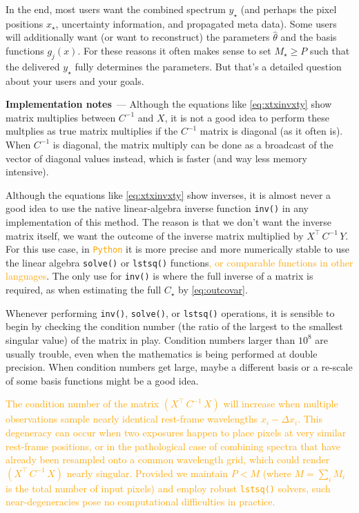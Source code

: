 \documentclass[modern, linenumbers]{aastex631}
\renewcommand{\paragraph}[1]{\medskip\par\noindent\textbf{#1}~---}
\newcommand{\modified}[1]{\textcolor{orange}{#1}}
\begin{document}
In the end, most users want the combined spectrum $y_\star$ (and perhaps the pixel positions $x_\star$, uncertainty information, and propagated meta data).
Some users will additionally want (or want to reconstruct) the parameters $\hat\theta$ and the basis functions $g_j(x)$.
For these reasons it often makes sense to set $M_\star\geq P$ such that the delivered $y_\star$ fully determines the parameters.
But that's a detailed question about your users and your goals.

\paragraph{Implementation notes}
Although the equations like \eqref{eq:xtxinvxty} show matrix multiplies between $C^{-1}$ and $X$, it is not a good idea to perform these multplies as true matrix multiplies if the $C^{-1}$ matrix is diagonal (as it often is).
When $C^{-1}$ is diagonal, the matrix multiply can be done as a broadcast of the vector of diagonal values instead, which is faster (and way less memory intensive).

Although the equations like \eqref{eq:xtxinvxty} show inverses, it is almost never a good idea to use the native linear-algebra inverse function \texttt{inv()} in any implementation of this method.
The reason is that we don't want the inverse matrix itself, we want the outcome of the inverse matrix multiplied by $X^\top\,C^{-1}\,Y$.
For this use case, in \modified{\texttt{Python}} it is more precise and more numerically stable to use the linear algebra \texttt{solve()} or \texttt{lstsq()} functions\modified{, or comparable functions in other languages}.
The only use for \texttt{inv()} is where the full inverse of a matrix is required, as when estimating the full $C_\star$ by \eqref{eq:outcovar}. %

Whenever performing \texttt{inv()}, \texttt{solve()}, or \texttt{lstsq()} operations, it is sensible to begin by checking the condition number (the ratio of the largest to the smallest singular value) of the matrix in play.
Condition numbers larger than $10^8$ are usually trouble, even when the mathematics is being performed at double precision.
When condition numbers get large, maybe a different basis or a re-scale of some basis functions might be a good idea.

\modified{The condition number of the matrix $(X^\top\,C^{-1}\,X)$ will increase when multiple observations sample nearly identical rest-frame wavelengths $x_i - \Delta{}x_i$. This degeneracy can occur when two exposures happen to place pixels at very similar rest-frame positions, or in the pathological case of combining spectra that have already been resampled onto a common wavelength grid, which could render $(X^\top\,C^{-1}\,X)$ nearly singular. Provided we maintain $P < M$ (where $M = \sum_i M_i$ is the total number of input pixels) and employ robust \texttt{lstsq()} solvers, such near-degeneracies pose no computational difficulties in practice.}
\end{document}
